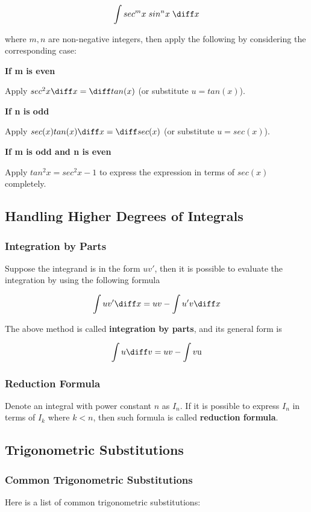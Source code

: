 $$\int sec^{m}x\; sin^{n}x\;\diff x$$\s

where $m,n$ are non-negative integers, then apply the following by considering the corresponding case:

\begin{alist}
  \item \textbf{If m is even}\n

  Apply $sec^{2}x\diff x=\diff tan(x)$ (or substitute $u=tan(x)$).

  \item \textbf{If n is odd}\n

  Apply $sec(x)tan(x)\diff x=\diff sec(x)$ (or substitute $u=sec(x)$).

  \item \textbf{If m is odd and n is even}\n

  Apply $tan^{2}x=sec^{2}x-1$ to express the expression in terms of $sec(x)$ completely.
\end{alist}

\subsection{Handling Higher Degrees of Integrals}
\subsubsection{Integration by Parts}
Suppose the integrand is in the form $uv'$, then it is possible to evaluate the integration by using the following formula

$$\int uv'\diff x=uv-\int u'v\diff x$$

The above method is called \textbf{integration by parts}, and its general form is

$$\int u\diff v=uv-\int v\mathrm{u}$$

\subsubsection{Reduction Formula}
Denote an integral with power constant $n$ as $I_{n}$. If it is possible to express $I_{n}$ in terms of $I_{k}$ where $k<n$, then such formula is called \textbf{reduction formula}.

\subsection{Trigonometric Substitutions}
\subsubsection{Common Trigonometric Substitutions}
Here is a list of common trigonometric substitutions:

